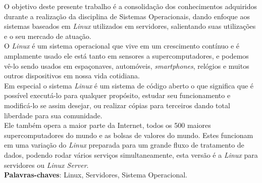
\setlength{\absparsep}{18pt} %
\begin{resumo}
    O objetivo deste presente trabalho é a consolidação dos conhecimentos adquiridos durante a realização da disciplina de Sistemas Operacionais, dando enfoque aos sistemas baseados em \emph{Linux} utilizados em servidores, salientando suas utilizações e o seu mercado de atuação. \\
    O \emph{Linux} é um sistema operacional que vive em um crescimento contínuo e é amplamente usado ele está tanto em sensores a supercomputadores, e podemos vê-lo sendo usados em espaçonaves, automóveis, \emph{smartphones}, relógios e muitos outros dispositivos em nossa vida cotidiana.\\
    Em especial o sistema \emph{Linux} é um sistema de código aberto o que significa que é possível executá-lo para qualquer propósito, estudar seu funcionamento e modificá-lo se assim desejar, ou realizar cópias para terceiros dando total liberdade para sua comunidade.\\
    Ele também opera a maior parte da Internet, todos os 500 maiores supercomputadores do mundo e as bolsas de valores do mundo. Estes funcionam em uma variação do \emph{Linux} preparada para um grande fluxo de tratamento de dados, podendo rodar vários serviços simultaneamente, esta versão é a \emph{Linux} para servidores ou \emph{Linux Server}.\\





 \textbf{Palavras-chaves}: Linux, Servidores, Sistema Operacional.
\end{resumo}


 
